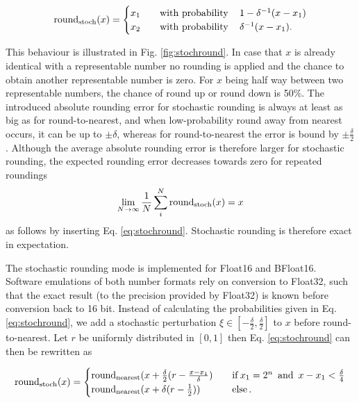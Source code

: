 \begin{equation}
\operatorname{round}_{\operatorname{stoch}}(x) =
\begin{cases}
x_1 \quad &\operatorname{with~probability}\quad 1 - \delta^{-1}(x - x_1)  \\
x_2 &\operatorname{with~probability}\quad  \delta^{-1}(x - x_1).
\end{cases}
\label{eq:stochround}
\end{equation}

This behaviour is illustrated in Fig. \ref{fig:stochround}. In case that $x$ is already identical with a representable number no rounding is applied
and the chance to obtain another representable number is zero. For $x$ being half way between two representable numbers, the chance of
round up or round down is 50\%. The introduced absolute rounding error for stochastic rounding is always at least as big as for round-to-nearest,
and when low-probability round away from nearest occurs, it can be up to $\pm \delta$, whereas for round-to-nearest the error is bound by
$\pm \tfrac{\delta}{2}$. Although the average absolute rounding error is therefore larger for stochastic rounding, the expected rounding error
decreases towards zero for repeated roundings
\begin{equation}
\lim_{N\to \infty}\frac{1}{N} \sum_i^N \operatorname{round}_{\operatorname{stoch}}(x) = x
\end{equation}
as follows by inserting Eq. \ref{eq:stochround}. Stochastic rounding is therefore exact in expectation.

The stochastic rounding mode is implemented for Float16 and BFloat16. Software emulations of both number formats rely on conversion to Float32,
such that the exact result (to the precision provided by Float32) is known before conversion back to 16 bit. Instead of calculating the probabilities
given in Eq. \ref{eq:stochround}, we add a stochastic perturbation $\xi \in [-\tfrac{\delta}{2},\tfrac{\delta}{2}]$ to $x$ before round-to-nearest.
Let $r$ be uniformly distributed in $[0,1]$ then Eq. \ref{eq:stochround} can then be rewritten as

\begin{equation}
\operatorname{round}_{\operatorname{stoch}}(x) =
\begin{cases}
\operatorname{round}_{\operatorname{nearest}}(x +\tfrac{\delta}{2}(r - \tfrac{x-x_1}{\delta}) \quad & \operatorname{if} x_1 = 2^n \operatorname{~and~} x-x_1 < \tfrac{\delta}{4}  \\
\operatorname{round}_{\operatorname{nearest}}(x + \delta(r-\tfrac{1}{2})) & \operatorname{else}.
\end{cases}
\end{equation}

